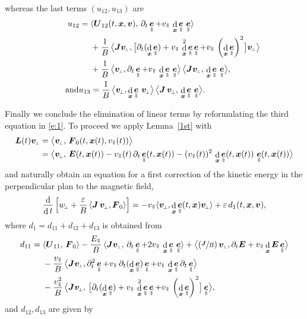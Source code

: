 \documentclass[10pt]{amsart}
\newcommand{\sperp}{{\scriptscriptstyle\perp}}
\newcommand{\blangle}{\bigl\langle}
\newcommand{\brangle}{\bigr\rangle}
\newcommand{\Psfrac}[2]{(\sfrac{#1}{#2})}
\let\eps\varepsilon
\let\d\partial
\DeclareMathOperator\dD{d}\let\dd\dD
\theoremstyle{plain}
\theoremstyle{definition}
\newcommand{\be}{\begin{equation}}
\newcommand{\ee}{\end{equation}}
\newcommand\bE{{\boldsymbol E}}
\newcommand\bF{{\boldsymbol F}}
\newcommand\bJ{{\boldsymbol J}}
\newcommand\bL{{\boldsymbol L}}
\newcommand\bU{{\boldsymbol U}}
\newcommand\bfv{{\boldsymbol v}}
\newcommand\bfx{{\boldsymbol x}}
\DeclareMathOperator{\beD}{\boldsymbol{e}}
\newcommand\eDpar{\beD_\mypar}
\newcommand\vpar{v_\mypar}
\newcommand\bvperp{\bfv_{\!\sperp}}
\newcommand\eperp{w_{\!\sperp}}
\newcommand\Epar{E_\mypar}
\newcommand{\mypar}{{\mkern3mu\vphantom{\perp}\vrule depth 0pt\mkern2mu\vrule depth 0pt\mkern3mu}}
\begin{document}
whereas the last terms $(u_{12},u_{13})$ are
\begin{align*}
u_{12}={}& \langle\bU_{12}(t,\bfx,\bfv),\,\d_t\eDpar+\vpar\,\dD_{\bfx}\eDpar\,\eDpar\rangle
\\
&+\frac{1}{B}\, \blangle
\bJ\bvperp,\bigl[\d_t(\dD_\bfx\eDpar)+\vpar\,\dD_{\bfx}^2\eDpar\eDpar+\vpar\,\left(\dD_{\bfx}\eDpar\right)^2\bigr]\bvperp \brangle
\\
&+ \frac{1}{B} \, \blangle \bvperp,\d_t\eDpar+\vpar\,\dD_{\bfx}\eDpar\,\eDpar\brangle\,
\blangle \bJ\bvperp,\, \dD_{\bfx}\eDpar\,\eDpar\brangle,\\
\tag*{and}
u_{13}&=
\frac{1}{B} \, \blangle \bvperp, \dD_{\bfx}\eDpar\,\bvperp\brangle\,
\blangle{\bJ}\,\bvperp,\, \dD_{\bfx}\eDpar\,\eDpar\brangle.
\end{align*}

Finally we conclude the elimination of linear terms by reformulating the third equation in \eqref{e:1}. To proceed we apply Lemma~\ref{1st} with
\begin{align*}
\bL(t)\bvperp&=\blangle \bvperp,\,\bF_0(t,\bfx(t),\vpar(t))\brangle\\
&=\blangle \bvperp,\,\bE(t,\bfx(t))
-\vpar(t)\,\d_t\eDpar(t,\bfx(t))
-(\vpar(t))^2\,\dD_{\bfx}\eDpar(t,\bfx(t))\, \eDpar(t,\bfx(t))\brangle
\end{align*}
and naturally obtain an equation for a first correction of the kinetic energy in
the perpendicular plan to the magnetic field,
\be
\label{e:ep}
\frac{\dD}{\dD t}\left[\eperp + \frac{\eps}{B}\,\langle
{\bJ}\,\bvperp,\bF_0\rangle
\right] =
-\vpar\langle\bvperp,
\dD_{\bfx}\eDpar(t,\bfx)\bvperp\rangle+\eps \,d_1(t,\bfx,\bfv),
\ee
where $d_1=d_{11}+d_{12}+d_{13}$ is obtained from
\begin{align*}
d_{11} ={}& \langle \bU_{11},\,\bF_0\rangle
- \frac{\Epar}{B}\,\langle
{\bJ}\bvperp,\,\d_t\eDpar+2\vpar\,\dD_{\bfx}\eDpar\,\eDpar\rangle
+ \blangle
\Psfrac{\bJ}{B}\,\bvperp,\d_t\bE+ \vpar\dD_\bfx\bE\eDpar\brangle
\\
&-\frac{\vpar}{B}\, \blangle
\bJ\bvperp,\d_t^2\eDpar+\vpar\,\d_t(\dD_{\bfx}\eDpar)\eDpar+\vpar\,\dD_{\bfx}\eDpar\d_t\eDpar\brangle
\\
&-
\frac{\vpar^2}{B}\, \blangle\bJ\bvperp,\,
\bigl[\d_t(\dD_\bfx\eDpar)+\vpar\,\dD_{\bfx}^2\eDpar\eDpar+\vpar\,\left(\dD_{\bfx}\eDpar\right)^2\bigr]\eDpar
\brangle,
\end{align*}
and $d_{12},d_{13}$ are given by
\end{document}
